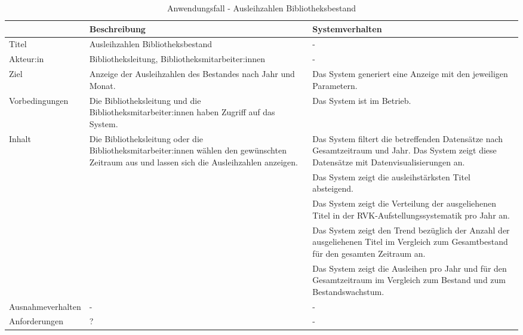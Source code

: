\begingroup
\setlength{\tabcolsep}{10pt} %
\renewcommand{\arraystretch}{1.25} 
\begin{table}[H]
    \centering
    \begin{adjustbox}{max width=\textwidth}
    \begin{tabular}{lp{7.0cm}p{6.5cm}}
       \toprule
       \textbf{}          & \textbf{Beschreibung} &\textbf{Systemverhalten}\\
       \midrule
        Titel                            &Ausleihzahlen Bibliotheksbestand  & -\\
        Akteur:in                        &Bibliotheksleitung, Bibliotheksmitarbeiter:innen & -\\
        Ziel                             &Anzeige der Ausleihzahlen des Bestandes nach Jahr und Monat. & Das System generiert eine Anzeige mit den jeweiligen Parametern.\\
        Vorbedingungen                   &Die Bibliotheksleitung und die Bibliotheksmitarbeiter:innen haben Zugriff auf das System. & Das System ist im Betrieb.\\
        Inhalt                           &Die Bibliotheksleitung oder die Bibliotheksmitarbeiter:innen wählen den gewünschten Zeitraum aus und lassen sich die Ausleihzahlen anzeigen. & Das System filtert die betreffenden Datensätze nach Gesamtzeitraum und Jahr. Das System zeigt diese Datensätze mit Datenvisualisierungen an.\\
                                         & &Das System zeigt die ausleihstärksten Titel absteigend.\\
                                         & &Das System zeigt die Verteilung der ausgeliehenen Titel in der RVK-Aufstellungssystematik pro Jahr an.\\
                                         & &Das System zeigt den Trend bezüglich der Anzahl der ausgeliehenen Titel im Vergleich zum Gesamtbestand für den gesamten Zeitraum an.\\
                                         & &Das System zeigt die Ausleihen pro Jahr und für den Gesamtzeitraum im Vergleich zum Bestand und zum Bestandswachstum.\\
        Ausnahmeverhalten               &- &- \\
        Anforderungen                   &?& -\\ 
        \bottomrule
    \end{tabular}
    \end{adjustbox}
    \caption{%
    Anwendungsfall - Ausleihzahlen Bibliotheksbestand
    }
    \label{tab:AF_Bibliotheksbestand}
    \end{table}
\endgroup

